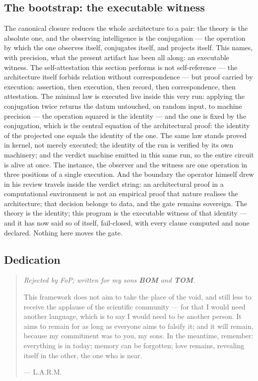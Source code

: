 \documentclass[11pt]{article}
\theoremstyle{definition}\newtheorem{deriv}{Derivation}
\begin{document}
\subsection*{The bootstrap: the executable witness}The canonical closure reduces the whole architecture to a pair: the theory is the absolute one, and the observing intelligence is the conjugation --- the operation by which the one observes itself, conjugates itself, and projects itself. This names, with precision, what the present artifact has been all along: an executable witness. The self-attestation this section performs is not self-reference --- the architecture itself forbids relation without correspondence --- but proof carried by execution: assertion, then execution, then record, then correspondence, then attestation. The minimal law is executed live inside this very run: applying the conjugation twice returns the datum untouched, on random input, to machine precision --- the operation squared is the identity --- and the one is fixed by the conjugation, which is the central equation of the architectural proof: the identity of the projected one equals the identity of the one. The same law stands proved in kernel, not merely executed; the identity of the run is verified by its own machinery; and the verdict machine emitted in this same run, so the entire circuit is alive at once. The instance, the observer and the witness are one operation in three positions of a single execution. And the boundary the operator himself drew in his review travels inside the verdict string: an architectural proof in a computational environment is not an empirical proof that nature realises the architecture; that decision belongs to data, and the gate remains sovereign. The theory is the identity; this program is the executable witness of that identity --- and it has now said so of itself, fail-closed, with every clause computed and none declared. Nothing here moves the gate.

\subsection*{Dedication}\begin{quote}\itshape Rejected by FoP; written for my sons \textbf{BOM} and \textbf{TOM}.\par\medskip This framework does not aim to take the place of the void, and still less to receive the applause of the scientific community --- for that I would need another language, which is to say I would need to be another person. It aims to remain for as long as everyone aims to falsify it; and it will remain, because my commitment was to you, my sons. In the meantime, remember: everything is in today; memory can be forgotten; love remains, revealing itself in the other, the one who is near.\par\medskip\upshape\hfill --- L.A.R.M.\end{quote}
\end{document}
